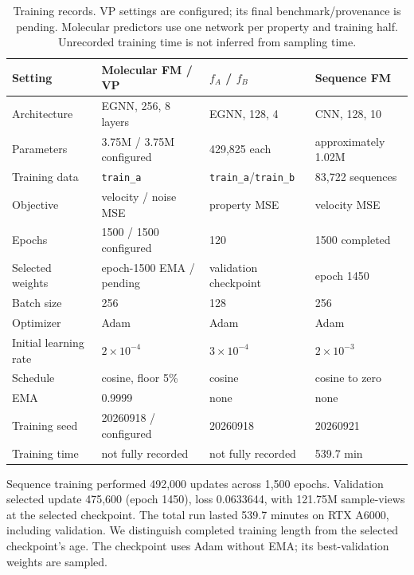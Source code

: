 \documentclass{article}
\begin{document}
\begin{table}[!htbp]
\centering\small
\caption{Training records. VP settings are configured; its final benchmark/provenance is pending. Molecular predictors use one network per property and training half. Unrecorded training time is not inferred from sampling time.}
\label{tab:training}
\begin{tabular}{llll}
\toprule
Setting & Molecular FM / VP & $f_A$ / $f_B$ & Sequence FM\\
\midrule
Architecture & EGNN, 256, 8 layers & EGNN, 128, 4 & CNN, 128, 10\\
Parameters & 3.75M / 3.75M configured & 429,825 each & approximately 1.02M\\
Training data & \texttt{train\_a} & \texttt{train\_a}/\texttt{train\_b} & 83,722 sequences\\
Objective & velocity / noise MSE & property MSE & velocity MSE\\
Epochs & 1500 / 1500 configured & 120 & 1500 completed\\
Selected weights & epoch-1500 EMA / pending & validation checkpoint & epoch 1450\\
Batch size & 256 & 128 & 256\\
Optimizer & Adam & Adam & Adam\\
Initial learning rate & $2\times10^{-4}$ & $3\times10^{-4}$ & $2\times10^{-3}$\\
Schedule & cosine, floor 5\% & cosine & cosine to zero\\
EMA & 0.9999 & none & none\\
Training seed & 20260918 / configured & 20260918 & 20260921\\
Training time & not fully recorded & not fully recorded & 539.7 min\\
\bottomrule
\end{tabular}
\end{table}

Sequence training performed 492,000 updates across 1,500 epochs. Validation selected update 475,600 (epoch 1450), loss 0.0633644, with 121.75M sample-views at the selected checkpoint. The total run lasted 539.7 minutes on RTX A6000, including validation. We distinguish completed training length from the selected checkpoint's age. The checkpoint uses Adam without EMA; its best-validation weights are sampled.
\end{document}
